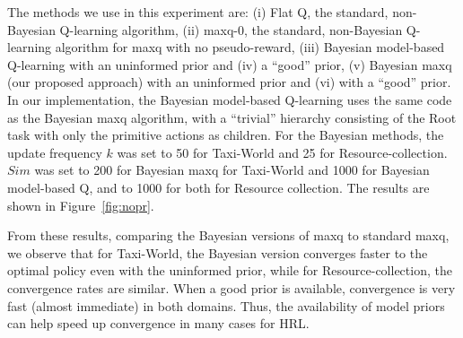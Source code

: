 The methods we use in this experiment are: (i) Flat Q, the standard,
non-Bayesian Q-learning algorithm, (ii) {\sc maxq-0}, the standard,
non-Bayesian Q-learning algorithm for {\sc maxq} with no pseudo-reward,
(iii) Bayesian model-based Q-learning with an uninformed prior and (iv) a ``good'' prior, (v) Bayesian {\sc maxq} (our proposed approach) with
an uninformed prior and (vi) with a ``good'' prior. In our implementation,
the Bayesian model-based Q-learning uses the same code as the Bayesian
{\sc maxq} algorithm, with a ``trivial'' hierarchy consisting of the Root
task with only the primitive actions as children. For the Bayesian methods, the update frequency $k$
was set to 50 for {\sf Taxi-World} and 25 for {\sf
  Resource-collection}. $Sim$ was set to 200 for Bayesian {\sc maxq} for
{\sf Taxi-World} and 1000 for Bayesian model-based Q, and to 1000 for
both for {\sf Resource collection}.
The results
 are shown in Figure~\ref{fig:nopr}. 

From these results, comparing the Bayesian versions of {\sc maxq} to 
standard {\sc maxq}, we observe that for {\sf Taxi-World}, the
Bayesian version converges faster to the optimal policy even with the
uninformed prior, while for {\sf Resource-collection}, the convergence
rates are similar. When a good prior is available, convergence is
very fast (almost immediate) in both domains. Thus, the availability
of model priors can help speed up convergence in many cases for HRL.

